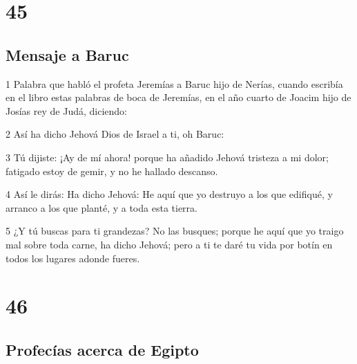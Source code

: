 \chapter{45}

\section*{Mensaje a Baruc}

\par 1 Palabra que habló el profeta Jeremías a Baruc hijo de Nerías, cuando escribía en el libro estas palabras de boca de Jeremías, en el año cuarto de Joacim hijo de Josías rey de Judá, diciendo:
\par 2 Así ha dicho Jehová Dios de Israel a ti, oh Baruc:
\par 3 Tú dijiste: ¡Ay de mí ahora! porque ha añadido Jehová tristeza a mi dolor; fatigado estoy de gemir, y no he hallado descanso.
\par 4 Así le dirás: Ha dicho Jehová: He aquí que yo destruyo a los que edifiqué, y arranco a los que planté, y a toda esta tierra.
\par 5 ¿Y tú buscas para ti grandezas? No las busques; porque he aquí que yo traigo mal sobre toda carne, ha dicho Jehová; pero a ti te daré tu vida por botín en todos los lugares adonde fueres.

\chapter{46}

\section*{Profecías acerca de Egipto }

